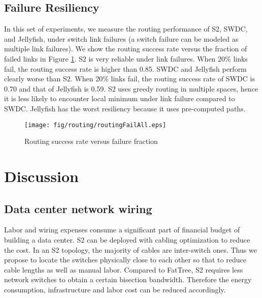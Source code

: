 \documentclass[10pt,conference]{IEEEtran}
\begin{document}
\subsection{Failure Resiliency}
In this set of experiments, we measure the routing performance of S2, SWDC, and Jellyfish, under switch link failures (a switch failure can be modeled as multiple link failures). We show the routing success rate versus the fraction of failed links in Figure \ref{fig:routingFail}. S2 is very reliable under link failures. When 20\% links fail, the routing success rate is higher than  0.85. SWDC and Jellyfish perform clearly worse than S2. When 20\% links fail, the routing success rate of SWDC is 0.70 and that of Jellyfish is 0.59. S2 uses greedy routing in multiple spaces, hence it is less likely to encounter local minimum under link failure compared to SWDC. Jellyfish has the worst resiliency because it uses pre-computed paths. 


\begin{figure}[t]
\centering
\texttt{[image: fig/routing/routingFailAll.eps]}
\vspace{-1ex}
\caption{ Routing success rate versus failure fraction}
\label{fig:routingFail}
\vspace{-5ex}
\end{figure}
\section{Discussion}
\label{sec:discussion}

\subsection{Data center network wiring}
\label{sec:wire}
Labor and wiring expenses consume a significant part of financial budget of building a data center.
S2 can be deployed with cabling optimization to reduce the cost.
In an S2 topology, the majority of cables are inter-switch ones.
Thus we propose to locate the switches physically close to each other so that to reduce cable lengths as well as manual labor.
Compared to FatTree, S2 requires less network switches to obtain a certain bisection bandwidth.
Therefore the energy consumption, infrastructure and labor cost can be reduced accordingly.
\end{document}
